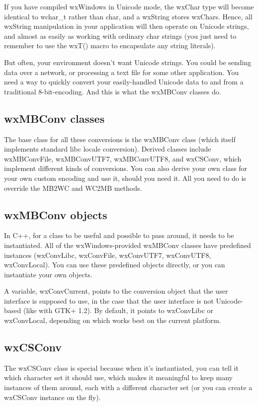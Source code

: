 If you have compiled wxWindows in Unicode mode, the wxChar type will become
identical to wchar\_t rather than char, and a wxString stores wxChars. Hence,
all wxString manipulation in your application will then operate on Unicode
strings, and almost as easily as working with ordinary char strings (you
just need to remember to use the wxT() macro to encapsulate any string
literals).

But often, your environment doesn't want Unicode strings. You could be sending
data over a network, or processing a text file for some other application. You
need a way to quickly convert your easily-handled Unicode data to and from a
traditional 8-bit-encoding. And this is what the wxMBConv classes do.

\subsection{wxMBConv classes}

The base class for all these conversions is the wxMBConv class (which itself
implements standard libc locale conversion). Derived classes include
wxMBConvFile, wxMBConvUTF7, wxMBConvUTF8, and wxCSConv, which implement
different kinds of conversions. You can also derive your own class for your
own custom encoding and use it, should you need it. All you need to do is
override the MB2WC and WC2MB methods.

\subsection{wxMBConv objects}

In C++, for a class to be useful and possible to pass around, it needs to be
instantiated. All of the wxWindows-provided wxMBConv classes have predefined
instances (wxConvLibc, wxConvFile, wxConvUTF7, wxConvUTF8, wxConvLocal).
You can use these predefined objects directly, or you can instantiate your own
objects.

A variable, wxConvCurrent, points to the conversion object that the user interface
is supposed to use, in the case that the user interface is not Unicode-based (like
with GTK+ 1.2). By default, it points to wxConvLibc or wxConvLocal, depending on
which works best on the current platform.

\subsection{wxCSConv}

The wxCSConv class is special because when it's instantiated, you can tell it
which character set it should use, which makes it meaningful to keep many
instances of them around, each with a different character set (or you can
create a wxCSConv instance on the fly).

